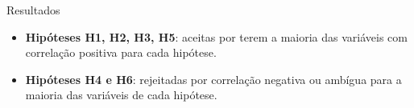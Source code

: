 \begin{frame}{Resultados}

\begin{itemize}
    \item \textbf{Hipóteses H1, H2, H3, H5}: aceitas por terem a maioria das variáveis com correlação positiva para cada hipótese.
    \item \textbf{Hipóteses H4 e H6}: rejeitadas por correlação negativa ou ambígua para a maioria das variáveis de cada hipótese.
\end{itemize}
\end{frame}
